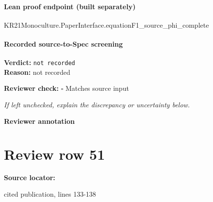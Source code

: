 \documentclass[10pt]{article}
\newcommand{\reviewerbox}{%
  \par\noindent\fbox{\parbox{0.96\linewidth}{\rule{0pt}{0.38in}}}\par
}
\newcommand{\reviewmatch}[1]{%
  \par\noindent\textbf{Reviewer check:} $\square$\; #1\par
  \noindent\emph{If left unchecked, explain the discrepancy or uncertainty below.}\par
}
\begin{document}
\paragraph{Lean proof endpoint (built separately)}\begin{ReviewVerbatim}
KR21Monoculture.PaperInterface.equationF1_source_phi_complete
\end{ReviewVerbatim}

\paragraph{Recorded source-to-Spec screening}
\textbf{Verdict:} \texttt{not recorded}
\\
\textbf{Reason:} not recorded
\reviewmatch{Matches source input}
\noindent\textbf{Reviewer annotation}\par
\reviewerbox
\clearpage
\hypertarget{source-claim-7ef5e5254a6c73ab}{}
\section*{Review row 51}
\textbf{Source locator:} {\footnotesize\raggedright cited publication, lines 133-\allowbreak{}138\par}
\end{document}

